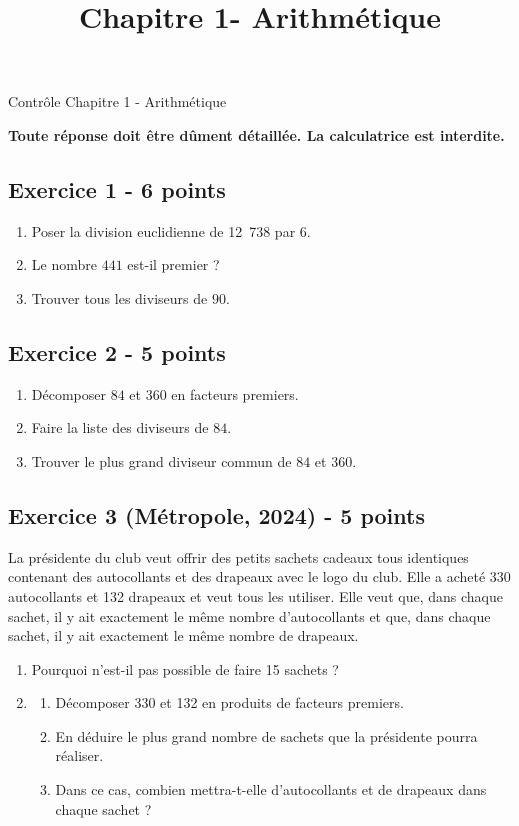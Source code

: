 \documentclass[14 pt]{extarticle}
\title{Chapitre 1-  Arithmétique}
\date{}
\theoremstyle{plain}
\begin{document}
\begin{center}{\Large Contrôle Chapitre 1 - Arithmétique}\\ 
 \end{center} 
 
 \textbf{Toute réponse doit être dûment détaillée. La calculatrice est interdite.}
\subsection*{Exercice 1 - 6 points} 
 
 \begin{enumerate}
 \item Poser la division euclidienne de 12~738 par 6. 
 \item Le nombre $441$ est-il premier ? 
 \item Trouver tous les diviseurs de $90$. 
 \end{enumerate}
 
\subsection*{Exercice 2 - 5 points} 
\begin{enumerate}
\item Décomposer $84$ et $360$ en facteurs premiers. 
\item Faire la liste des diviseurs de $84$. 
\item Trouver le plus grand diviseur commun de $84$ et $360$.
\end{enumerate} 

 
 \subsection*{Exercice 3 (Métropole, 2024) - 5 points}
 
La présidente du club veut offrir des petits sachets cadeaux tous identiques contenant des autocollants et des drapeaux avec le logo du club. Elle a acheté 330 autocollants et 132 drapeaux et veut tous les utiliser. Elle veut que, dans chaque sachet, il y ait exactement le même nombre d'autocollants et que, dans chaque sachet, il y ait exactement le même nombre de drapeaux.

\medskip

\begin{enumerate}
\item Pourquoi n'est-il pas possible de faire 15 sachets ?
\item 
	\begin{enumerate}
		\item Décomposer 330 et 132 en produits de facteurs premiers.
		\item En déduire le plus grand nombre de sachets que la présidente pourra réaliser.
		\item Dans ce cas, combien mettra-t-elle d'autocollants et de drapeaux dans chaque sachet ?
	\end{enumerate}
\end{enumerate}
 
\end{document}
